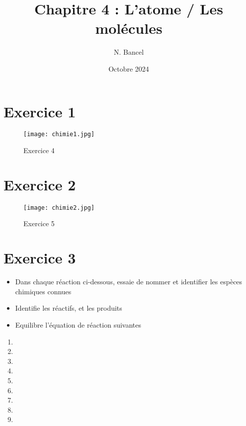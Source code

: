 \documentclass[a4paper,12pt]{article}
\begin{document}
\title{Chapitre 4 : L'atome / Les molécules}
\author{N. Bancel}
\date{Octobre 2024}
\maketitle

\section{Exercice 1}

\begin{figure}[H]
  \centering
  \texttt{[image: chimie1.jpg]}
  \caption{\label{} Exercice 4}
\end{figure}

\section{Exercice 2}

\begin{figure}[H]
  \centering
  \texttt{[image: chimie2.jpg]}
  \caption{\label{} Exercice 5}
\end{figure}

\section{Exercice 3}

\begin{itemize}[noitemsep]
\item Dans chaque réaction ci-dessous, essaie de nommer et identifier les espèces chimiques connues 
\item Identifie les réactifs, et les produits
\item Equilibre l'équation de réaction suivantes
\end{itemize} 

\begin{enumerate}
  \item {}
  \item {}
  \item {}
  \item {}
  \item {}
  \item {}
  \item {}
  \item {}
  \item {}
\end{enumerate} 
\end{document}
